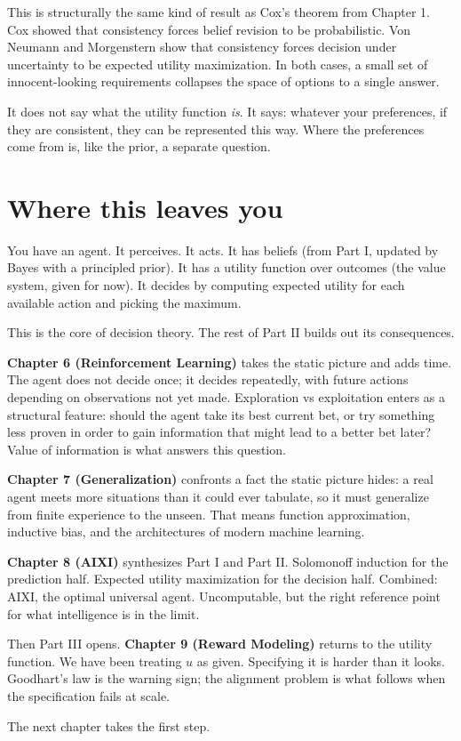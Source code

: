 This is structurally the same kind of result as Cox's theorem from Chapter 1. Cox showed that consistency forces belief revision to be probabilistic. Von Neumann and Morgenstern show that consistency forces decision under uncertainty to be expected utility maximization. In both cases, a small set of innocent-looking requirements collapses the space of options to a single answer.

It does not say what the utility function \emph{is}. It says: whatever your preferences, if they are consistent, they can be represented this way. Where the preferences come from is, like the prior, a separate question.

\section*{Where this leaves you}

You have an agent. It perceives. It acts. It has beliefs (from Part I, updated by Bayes with a principled prior). It has a utility function over outcomes (the value system, given for now). It decides by computing expected utility for each available action and picking the maximum.

This is the core of decision theory. The rest of Part II builds out its consequences.

\textbf{Chapter 6 (Reinforcement Learning)} takes the static picture and adds time. The agent does not decide once; it decides repeatedly, with future actions depending on observations not yet made. Exploration vs exploitation enters as a structural feature: should the agent take its best current bet, or try something less proven in order to gain information that might lead to a better bet later? Value of information is what answers this question.

\textbf{Chapter 7 (Generalization)} confronts a fact the static picture hides: a real agent meets more situations than it could ever tabulate, so it must generalize from finite experience to the unseen. That means function approximation, inductive bias, and the architectures of modern machine learning.

\textbf{Chapter 8 (AIXI)} synthesizes Part I and Part II. Solomonoff induction for the prediction half. Expected utility maximization for the decision half. Combined: AIXI, the optimal universal agent. Uncomputable, but the right reference point for what intelligence is in the limit.

Then Part III opens. \textbf{Chapter 9 (Reward Modeling)} returns to the utility function. We have been treating $u$ as given. Specifying it is harder than it looks. Goodhart's law is the warning sign; the alignment problem is what follows when the specification fails at scale.

The next chapter takes the first step.
